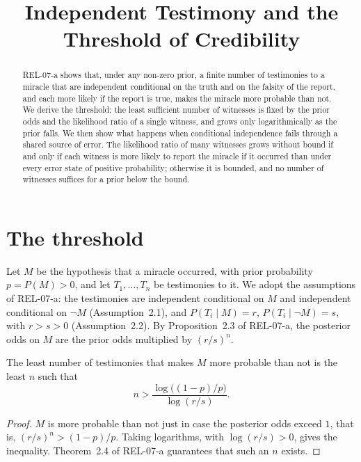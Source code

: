 \documentclass{situationist-preprint}
\title{Independent Testimony and the Threshold of Credibility}
\begin{document}
\maketitle

\begin{abstract}
REL-07-a shows that, under any non-zero prior, a finite number of testimonies to a miracle that are independent conditional on the truth and on the falsity of the report, and each more likely if the report is true, makes the miracle more probable than not. We derive the threshold: the least sufficient number of witnesses is fixed by the prior odds and the likelihood ratio of a single witness, and grows only logarithmically as the prior falls. We then show what happens when conditional independence fails through a shared source of error. The likelihood ratio of many witnesses grows without bound if and only if each witness is more likely to report the miracle if it occurred than under every error state of positive probability; otherwise it is bounded, and no number of witnesses suffices for a prior below the bound.
\end{abstract}

\section{The threshold}

Let $M$ be the hypothesis that a miracle occurred, with prior probability $p = P(M) > 0$, and let $T_1, \dots, T_n$ be testimonies to it. We adopt the assumptions of REL-07-a: the testimonies are independent conditional on $M$ and independent conditional on $\neg M$ (Assumption~2.1), and $P(T_i \mid M) = r$, $P(T_i \mid \neg M) = s$, with $r > s > 0$ (Assumption~2.2). By Proposition~2.3 of REL-07-a, the posterior odds on $M$ are the prior odds multiplied by $(r/s)^n$.

\begin{proposition}\label{p:n}
The least number of testimonies that makes $M$ more probable than not is the least $n$ such that
\[
n > \frac{\log\big((1-p)/p\big)}{\log(r/s)}.
\]
\end{proposition}

\begin{proof}
$M$ is more probable than not just in case the posterior odds exceed $1$, that is, $(r/s)^n > (1-p)/p$. Taking logarithms, with $\log(r/s) > 0$, gives the inequality. Theorem~2.4 of REL-07-a guarantees that such an $n$ exists.
\end{proof}
\end{document}

